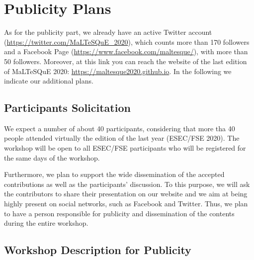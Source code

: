 
\section{Publicity Plans}

As for the publicity part, we already have an active Twitter account (\url{https://twitter.com/MaLTeSQuE_2020}), which counts more than 170 followers and a Facebook Page (\url{https://www.facebook.com/maltesque/}), with more than 50 followers.
Moreover, at this link you can reach the website of the last edition of MaLTeSQuE 2020: \url{https://maltesque2020.github.io}.
In the following we indicate our additional plans.

\subsection{Participants Solicitation}

We expect a number of about 40 participants, considering that more tha 40 people attended virtually the edition of the last year (ESEC/FSE 2020).
The workshop will be open to all ESEC/FSE participants who will be registered for the same days of the workshop.

Furthermore, we plan to support the wide dissemination of the accepted contributions as well as the participants' discussion.
To this purpose, we will ask the contributors to share their presentation on our website and we aim at being highly present on social networks, such as Facebook and Twitter.
Thus, we plan to have a person responsible for publicity and dissemination of the contents during the entire workshop.

\subsection{Workshop Description for Publicity}

